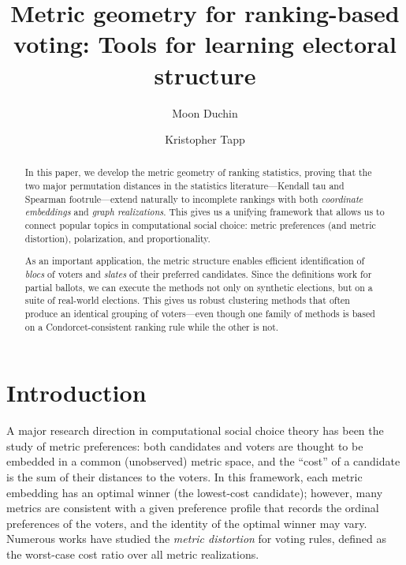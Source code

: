 \documentclass{amsart}
\title[Metric geometry for ranking-based voting]{Metric geometry for ranking-based voting: Tools for learning electoral structure}
\author{Moon Duchin}
\author{Kristopher Tapp}
\theoremstyle{plain}
\theoremstyle{definition}
\theoremstyle{remark}
\begin{document}
\begin{abstract}
In this paper, we develop the metric geometry of ranking statistics, proving that the two major permutation distances in the statistics literature---Kendall tau and Spearman footrule---extend naturally to incomplete rankings with both {\em coordinate embeddings} and {\em graph realizations}.
This gives us a unifying framework that allows us to connect popular topics in computational social choice:  metric preferences (and metric distortion), polarization, and proportionality.

As an important application, the metric structure enables efficient identification of {\em blocs} of voters and {\em slates} of their preferred candidates. Since the definitions work for partial ballots, we can execute the methods not only on synthetic elections, but on a suite of real-world elections.  This gives us robust clustering methods that often produce an identical grouping of voters---even though one family of methods is based on a Condorcet-consistent ranking rule while the other is not.
\end{abstract}
\maketitle

\vspace{1cm}
\setcounter{tocdepth}{2}
\tableofcontents

\newpage
\section{Introduction}\label{S:intro}

A major research direction in computational social choice theory has been the study of metric preferences:  both candidates and voters are thought to be embedded in a common (unobserved) metric space, and the ``cost'' of a candidate is the sum of their distances to the voters.  In this framework, each metric embedding has an optimal winner (the lowest-cost candidate); however, many metrics are consistent with a given preference profile that records the ordinal preferences of the voters, and the identity of the optimal winner may vary.  Numerous works have studied the {\em metric distortion} for voting rules, defined as the worst-case cost ratio over all metric realizations.  

\end{document}
